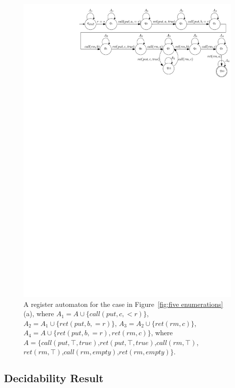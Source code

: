 \begin{figure}[t]
  \centering
  \includegraphics[width=0.65 \textwidth]{figures/PIC-WitnessAutomata-For1.pdf}
  \caption{A register automaton for the case in Figure~\ref{fig:five enumerations}(a), where $A_1 = A \cup \{ \textit{call}(\textit{put},c,<r)\}$, $A_2 = A_1 \cup \{ \textit{ret}(\textit{put},b,=r) \}$, $A_3 = A_2 \cup \{ \textit{ret}(\textit{rm},c) \}$, $A_4 = A \cup \{ \textit{ret}(\textit{put},b,=r), \textit{ret}(\textit{rm},c) \}$, where $A = \{ \textit{call}(\textit{put},\top,\textit{true})$,$\textit{ret}(\textit{put},\top,\textit{true})$,$\textit{call}(\textit{rm},\top)$,$\textit{ret}(\textit{rm},\top)$,$\textit{call}(\textit{rm},\textit{empty})$,$\textit{ret}(\textit{rm},\textit{empty})\}$.}
  \label{fig:an enumeration and its witness automaton}
\end{figure}



\subsection{Decidability Result}
\label{subsec:combine step-by-step linearizability and co-regular}

